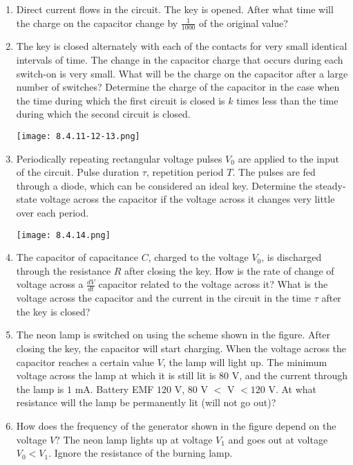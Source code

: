 \documentclass{article}
\begin{document}
\begin{enumerate}[label=8.4.\arabic*]
\item Direct current flows in the circuit. The key is opened. After what time will the charge on the capacitor change by $\frac{1}{1000}$ of the original value?

\item The key is closed alternately with each of the contacts for very small identical intervals of time. The change in the capacitor charge that occurs during each switch-on is very small. What will be the charge on the capacitor after a large number of switches? Determine the charge of the capacitor in the case when the time during which the first circuit is closed is $k$ times less than the time during which the second circuit is closed.

\begin{center}
    \texttt{[image: 8.4.11-12-13.png]}
\end{center}

\item Periodically repeating rectangular voltage pulses $V_0$ are applied to the input of the circuit. Pulse duration $\tau$, repetition period $T$. The pulses are fed through a diode, which can be considered an ideal key. Determine the steady-state voltage across the capacitor if the voltage across it changes very little over each period.

\begin{center}
    \texttt{[image: 8.4.14.png]}
\end{center}

\item The capacitor of capacitance $C$, charged to the voltage $V_0$, is discharged through the resistance $R$ after closing the key. How is the rate of change of voltage across a $\frac{dV}{dt}$ capacitor related to the voltage across it? What is the voltage across the capacitor and the current in the circuit in the time $\tau$ after the key is closed?

\item The neon lamp is switched on using the scheme shown in the figure. After closing the key, the capacitor will start charging. When the voltage across the capacitor reaches a certain value $V$, the lamp will light up. The minimum voltage across the lamp at which it is still lit is $80$ V, and the current through the lamp is $1$ mA. Battery EMF $120$ V, $80$ V $<$ V $< 120$ V. At what resistance will the lamp be permanently lit (will not go out)?

\item How does the frequency of the generator shown in the figure depend on the voltage $V$? The neon lamp lights up at voltage $V_1$ and goes out at voltage $V_0 < V_1$. Ignore the resistance of the burning lamp.



\end{enumerate}
\end{document}
